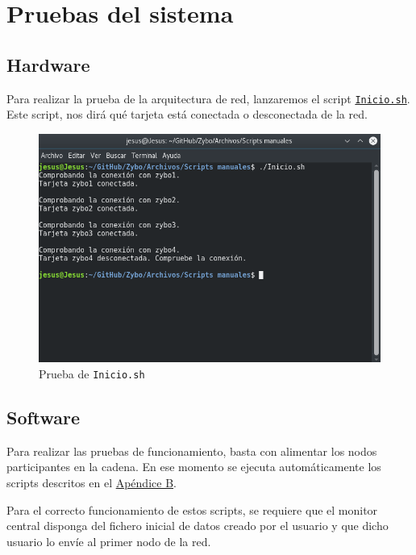 \section{Pruebas del sistema}
\subsection{Hardware}
Para realizar la prueba de la arquitectura de red, lanzaremos el script \hyperlink{ScriptConexion}{\texttt{Inicio.sh}}. Este script, nos dirá qué tarjeta está conectada o desconectada de la red.

\begin{figure}[h]
	\centering
	\includegraphics[scale=0.5]{Metodologia/Pruebas/Prueba_Inicio_sh.png}
	\caption{Prueba de \texttt{Inicio.sh}}
	\label{Prueba de Inicio.sh}
\end{figure}

\subsection{Software}
Para realizar las pruebas de funcionamiento, basta con alimentar los nodos participantes en la cadena. En ese momento se ejecuta automáticamente los scripts descritos en el \hyperlink{Scripts}{Apéndice B}. 

Para el correcto funcionamiento de estos scripts, se requiere que el monitor central disponga del fichero inicial de datos creado por el usuario y que dicho usuario lo envíe al primer nodo de la red.

